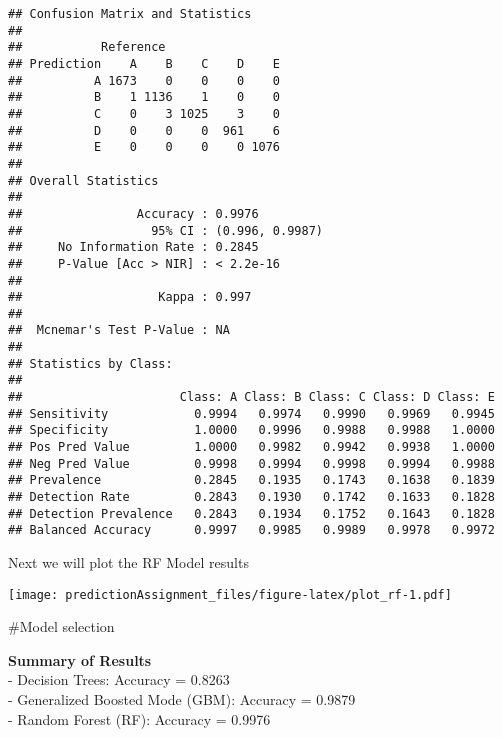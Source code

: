 \documentclass[]{article}
\newenvironment{Shaded}{\begin{snugshade}}{\end{snugshade}}
\newcommand{\DataTypeTok}[1]{\textcolor[rgb]{0.13,0.29,0.53}{#1}}
\newcommand{\DecValTok}[1]{\textcolor[rgb]{0.00,0.00,0.81}{#1}}
\newcommand{\KeywordTok}[1]{\textcolor[rgb]{0.13,0.29,0.53}{\textbf{#1}}}
\newcommand{\NormalTok}[1]{#1}
\newcommand{\OperatorTok}[1]{\textcolor[rgb]{0.81,0.36,0.00}{\textbf{#1}}}
\newcommand{\OtherTok}[1]{\textcolor[rgb]{0.56,0.35,0.01}{#1}}
\newcommand{\StringTok}[1]{\textcolor[rgb]{0.31,0.60,0.02}{#1}}
\begin{document}
\begin{verbatim}
## Confusion Matrix and Statistics
## 
##           Reference
## Prediction    A    B    C    D    E
##          A 1673    0    0    0    0
##          B    1 1136    1    0    0
##          C    0    3 1025    3    0
##          D    0    0    0  961    6
##          E    0    0    0    0 1076
## 
## Overall Statistics
##                                          
##                Accuracy : 0.9976         
##                  95% CI : (0.996, 0.9987)
##     No Information Rate : 0.2845         
##     P-Value [Acc > NIR] : < 2.2e-16      
##                                          
##                   Kappa : 0.997          
##                                          
##  Mcnemar's Test P-Value : NA             
## 
## Statistics by Class:
## 
##                      Class: A Class: B Class: C Class: D Class: E
## Sensitivity            0.9994   0.9974   0.9990   0.9969   0.9945
## Specificity            1.0000   0.9996   0.9988   0.9988   1.0000
## Pos Pred Value         1.0000   0.9982   0.9942   0.9938   1.0000
## Neg Pred Value         0.9998   0.9994   0.9998   0.9994   0.9988
## Prevalence             0.2845   0.1935   0.1743   0.1638   0.1839
## Detection Rate         0.2843   0.1930   0.1742   0.1633   0.1828
## Detection Prevalence   0.2843   0.1934   0.1752   0.1643   0.1828
## Balanced Accuracy      0.9997   0.9985   0.9989   0.9978   0.9972
\end{verbatim}

Next we will plot the RF Model results

\begin{Shaded}
\end{Shaded}

\texttt{[image: predictionAssignment\_files/figure-latex/plot\_rf-1.pdf]}

\#Model selection

\textbf{Summary of Results}\\
- Decision Trees: Accuracy = 0.8263\\
- Generalized Boosted Mode (GBM): Accuracy = 0.9879\\
- Random Forest (RF): Accuracy = 0.9976
\end{document}
